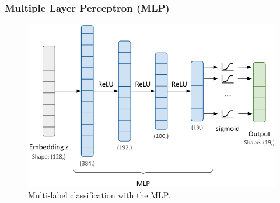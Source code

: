 \subsubsection{Multiple Layer Perceptron (MLP)}

\begin{figure}[t]
  \centering
   \includegraphics[width=\linewidth]{figures/mlp.png}
   \caption{Multi-label classification with the MLP.}
   \label{fig:mlp}
\end{figure}

